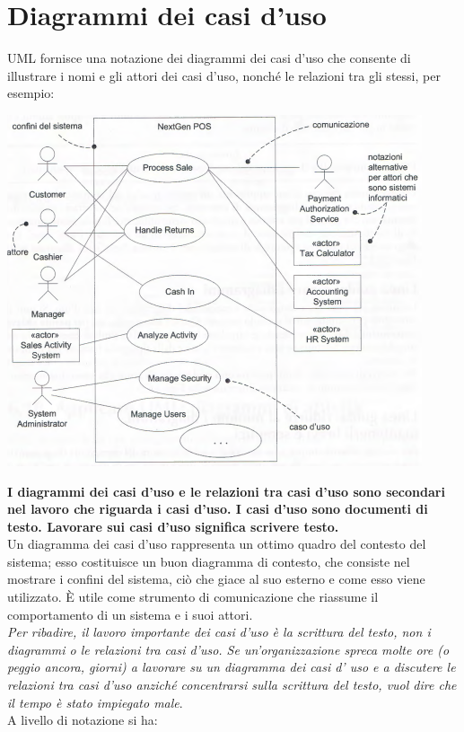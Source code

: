 \documentclass[a4paper,12pt, oneside]{book}
\begin{document}
\section{Diagrammi dei casi d'uso}
UML fornisce una notazione dei diagrammi dei casi d'uso che consente di illustrare i nomi e gli attori dei casi d'uso, nonché le relazioni tra gli stessi, per esempio:
\begin{center}
	\includegraphics[scale=0.7]{img/casd.png}
\end{center}
\newpage
\textbf{I diagrammi dei casi d'uso e le relazioni tra casi d'uso sono secondari nel lavoro che
riguarda i casi d'uso. I casi d'uso sono documenti di testo. Lavorare sui casi d'uso significa scrivere testo.} \\
Un diagramma dei casi d'uso rappresenta un ottimo quadro del contesto del sistema; esso costituisce un buon diagramma di contesto, che consiste nel mostrare i confini del sistema, ciò che giace al suo esterno e come esso viene utilizzato. È utile come strumento di comunicazione che riassume il comportamento di un sistema e i suoi attori.\\
\textit{Per ribadire, il lavoro importante dei casi d'uso è la scrittura del testo, non i diagrammi o le relazioni tra casi d'uso. Se un'organizzazione spreca molte ore (o peggio ancora, giorni) a lavorare su un diagramma dei casi d' uso e a discutere le relazioni tra casi d'uso anziché concentrarsi sulla scrittura del testo, vuol dire che il tempo è stato impiegato male}.\\
A livello di notazione si ha:
\end{document}
